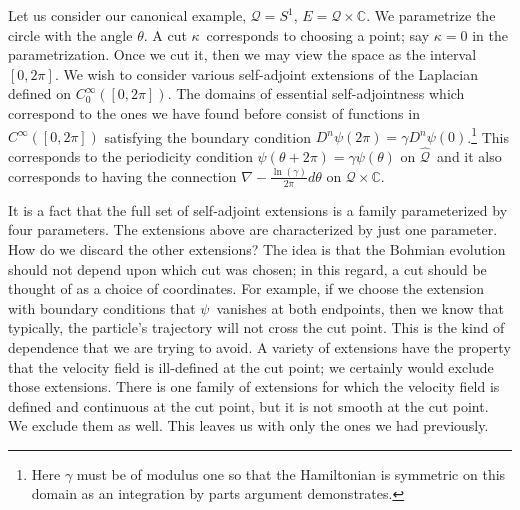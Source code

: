 \documentclass[11pt]{article}
\theoremstyle{remark}
\begin{document}
 
Let us consider our canonical example, $\ensuremath{\mathcal{Q}} = S^1$, $E=
\ensuremath{\mathcal{Q}} \times \ensuremath{\mathbb{C}}$. We parametrize the circle with 
the angle $\theta$.
A cut \ensuremath{\kappa}\ corresponds to choosing a point; say $\ensuremath{\kappa} = 0$ in the
parametrization.   
Once we cut it, then we may view the space as the interval $[0,
 2\pi]$. We wish to consider various self-adjoint extensions of the
Laplacian defined on $\ensuremath{C^{\infty}_0}([0,2\pi])$. The domains of essential
self-adjointness which correspond to the ones we have found before
consist of functions in 
$C^{\infty} ( [0, 2\pi])$
 satisfying the boundary condition $D^n \ensuremath{\psi}( 2 \pi) = \gamma
D^n \ensuremath{\psi} (0)$.\footnote{Here $\gamma$ must be of modulus one so that the
Hamiltonian is symmetric on this domain as an integration by
parts argument demonstrates.}  
This corresponds to the
periodicity condition $\ensuremath{\psi} (\theta + 2 \pi) = \gamma
 \ensuremath{\psi} (\theta)$ on \ensuremath{\widehat{\ensuremath{\mathcal{Q}}}}\ 
and it also corresponds to having 
the connection $\nabla -  \frac{\ln(\gamma)}{2 \pi} d\theta$ on
$ \ensuremath{\mathcal{Q}}\times \ensuremath{\mathbb{C}}$.


It is a  fact that the full set of
self-adjoint extensions  is a family parameterized by four
parameters. The extensions above are
 characterized by just one parameter. How do we discard the other
extensions? The idea is that the Bohmian evolution should not depend
upon which cut was chosen; in this regard, a cut should be thought of
as a choice of coordinates. For example, if we choose the extension
with boundary conditions that \ensuremath{\psi}\ vanishes at both endpoints, then
we know that typically, the particle's trajectory will not cross the
cut point. This is the kind of dependence that we are trying to
avoid.  
A variety of extensions have the property that the velocity
field is ill-defined at the cut point; we certainly would exclude
those extensions. There is one family of
extensions for which the velocity field is defined and continuous at
the cut point, but it is not smooth
at the cut point. We exclude them as well. This leaves us with only
the ones we had previously.
\end{document}
